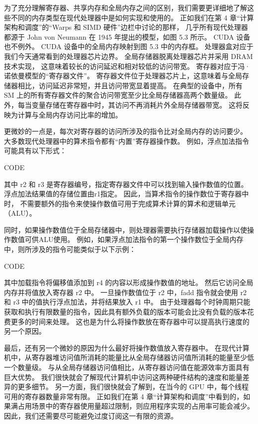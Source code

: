 为了充分理解寄存器、共享内存和全局内存之间的区别，我们需要更详细地了解这些不同的内存类型在现代处理器中是如何实现和使用的。 
正如我们在第 4 章“计算架构和调度”的“Warps 和 SIMD 硬件”边栏中讨论的那样，
几乎所有现代处理器都源于 John von Neumann 在 1945 年提出的模型，如图 5.3 所示。 
CUDA 设备也不例外。 CUDA 设备中的全局内存映射到图 5.3 中的内存框。 
处理器盒对应于我们今天通常看到的处理器芯片边界。 全局存储器脱离处理器芯片并采用 DRAM 技术实现，
这意味着较长的访问延迟和相对较低的访问带宽。 寄存器对应于冯·诺依曼模型的“寄存器文件”。 
寄存器文件位于处理器芯片上，这意味着与全局存储器相比，访问延迟非常短，并且访问带宽显着提高。 
在典型的设备中，所有 SM 上的所有寄存器文件的聚合访问带宽至少比全局存储器高两个数量级。 
此外，每当变量存储在寄存器中时，其访问不再消耗片外全局存储器带宽。 这将反映为计算与全局内存访问比率的增加。

更微妙的一点是，每次对寄存器的访问所涉及的指令比对全局内存的访问要少。 
大多数现代处理器中的算术指令都有“内置”寄存器操作数。 例如，浮点加法指令可能具有以下形式：

{\color{red} CODE}

其中 r2 和 r3 是寄存器编号，指定寄存器文件中可以找到输入操作数值的位置。 
浮点加法结果值的存储位置由r1指定。 因此，当算术指令的操作数位于寄存器中时，
不需要额外的指令来使操作数值可用于完成算术计算的算术和逻辑单元（ALU）。

同时，如果操作数值位于全局存储器中，则处理器需要执行存储器加载操作以使操作数值可供ALU使用。 
例如，如果浮点加法指令的第一个操作数位于全局内存中，则所涉及的指令可能类似于以下示例：

{\color{red} CODE}

其中加载指令将偏移值添加到 r4 的内容以形成操作数值的地址。 然后它访问全局内存并将值放入寄存器 r2 中。 
一旦操作数值位于 r2 中，fadd 指令就会使用 r2 和 r3 中的值执行浮点加法，并将结果放入 r1 中。 
由于处理器每个时钟周期只能获取和执行有限数量的指令，因此具有额外负载的版本可能会比没有负载的版本花费更多的时间来处理。 
这也是为什么将操作数放在寄存器中可以提高执行速度的另一个原因。

最后，还有另一个微妙的原因为什么最好将操作数值放入寄存器中。 
在现代计算机中，从寄存器堆访问值所消耗的能量比从全局存储器访问值所消耗的能量至少低一个数量级。 
与从全局存储器访问值相比，从寄存器访问值在能源效率方面具有巨大优势。 
我们很快就会了解现代计算机中访问这两种硬件结构的速度和能量差异的更多细节。 
另一方面，我们很快就会了解到，在当今的 GPU 中，每个线程可用的寄存器数量非常有限。 
正如我们在第 4 章“计算架构和调度”中看到的，如果满占用场景中的寄存器使用量超过限制，则应用程序实现的占用率可能会减少。 
因此，我们还需要尽可能避免过度订阅这一有限的资源。

